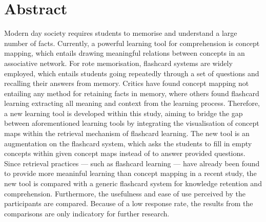 \chapter{Abstract}

Modern day society requires students to memorise and understand a large number of facts. Currently, a powerful learning tool for comprehension is concept mapping, which entails drawing meaningful relations between concepts in an associative network. For rote memorisation, flashcard systems are widely employed, which entails students going repeatedly through a set of questions and recalling their answers from memory. Critics have found concept mapping not entailing any method for retaining facts in memory, where others found flashcard learning extracting all meaning and context from the learning process. Therefore, a new learning tool is developed within this study, aiming to bridge the gap between aforementioned learning tools by integrating the visualisation of concept maps within the retrieval mechanism of flashcard learning. The new tool is an augmentation on the flashcard system, which asks the students to fill in empty concepts within given concept maps instead of to answer provided questions. Since retrieval practices --- such as flashcard learning --- have already been found to provide more meaninful learning than concept mapping in a recent study, the new tool is compared with a generic flashcard system for knowledge retention and comprehension. Furthermore, the usefulness and ease of use perceived by the participants are compared. Because of a low response rate, the results from the comparisons are only indicatory for further research.
